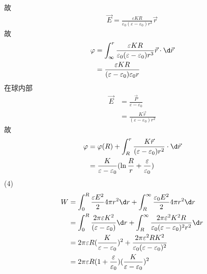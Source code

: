 \documentclass{phyasgn}
\begin{document}
\begin{sol}[8]
\begin{align*}
    \end{align*}
    故
    \begin{align*}
        \vec{E}=\frac{\varepsilon KR}{\varepsilon_0(\varepsilon-\varepsilon_0)r^3}\vec{r}
    \end{align*}
    故
    \begin{align*}
        \varphi&=\int_{\infty}^{r}\frac{\varepsilon KR}{\varepsilon_0(\varepsilon-\varepsilon_0)r^3}\vec{r}\cdot\d \vec{r}\\
        &=\frac{\varepsilon KR}{(\varepsilon-\varepsilon_0)\varepsilon_0r}
    \end{align*}
    在球内部
    \begin{align*}
        \vec{E}&=\frac{\vec{P}}{\varepsilon-\varepsilon_0}\\
        &=\frac{K\vec{r}}{(\varepsilon-\varepsilon_0)r^2}
    \end{align*}
    故
    \begin{align*}
        \varphi&=\varphi(R)+\int_{R}^{r}\frac{K\vec{r}}{(\varepsilon-\varepsilon_0)r^2}\cdot\d\vec{r}\\
        &=\frac{K}{\varepsilon-\varepsilon_0}(\ln\frac{R}{r}+\frac{\varepsilon}{\varepsilon_0})
    \end{align*}
    (4)\begin{align*}
        W&=\int_{0}^{R}\frac{\varepsilon E^2}{2}4\pi r^2\d r+\int_{R}^{\infty}\frac{\varepsilon_0 E^2}{2}4\pi r^2\d r\\
        &=\int_{0}^{R}\frac{2\pi\varepsilon K^2}{(\varepsilon-\varepsilon_0)}\d r+\int_{R}^{\infty}\frac{2\pi\varepsilon^2K^2R}{\varepsilon_0(\varepsilon-\varepsilon_0)^2r^2}\d r\\
        &=2\pi\varepsilon R(\frac{K}{\varepsilon-\varepsilon_0})^2+\frac{2\pi\varepsilon^2RK^2}{\varepsilon_0(\varepsilon-\varepsilon_0)^2}\\
        &=2\pi\varepsilon R(1+\frac{\varepsilon}{\varepsilon_0})(\frac{K}{\varepsilon-\varepsilon_0})^2
    \end{align*}
\end{sol}\par
\end{document}
